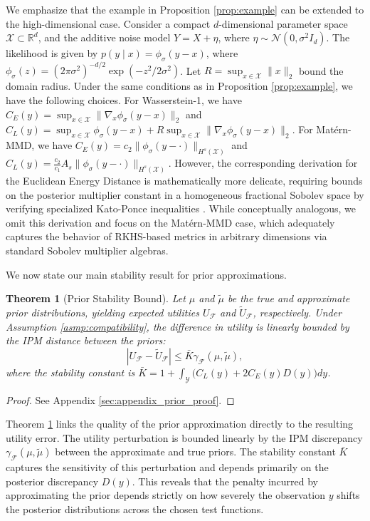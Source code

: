 \documentclass[twoside,11pt]{article}
\newtheorem{thm}{Theorem}[section]
\begin{document}
We emphasize that the example in Proposition \ref{prop:example} can be extended to the high-dimensional case. Consider a compact $d$-dimensional parameter space $\mathcal{X}\subset \mathbb{R}^d$, and the additive noise model $Y=X+\eta$, where $\eta\sim \mathcal{N}(0,\sigma^2 I_d)$. The likelihood is given by $p(y \mid x) = \phi_\sigma(y-x)$, where $\phi_\sigma(z) = (2\pi\sigma^2)^{-d/2} \exp(-z^2 / 2\sigma^2)$. Let $R=\sup_{x\in\mathcal{X}}\|x\|_2$ bound the domain radius. Under the same conditions as in Proposition \ref{prop:example}, we have the following choices. For Wasserstein-1, we have $C_E(y) = \sup_{x\in\mathcal{X}} \|\nabla_x\phi_{\sigma}(y-x)\|_2$ and $C_L(y) = \sup_{x \in \mathcal{X}} \phi_\sigma(y-x) + R \sup_{x \in \mathcal{X}} \|\nabla_x\phi_{\sigma}(y-x)\|_2$. For Mat\'ern-MMD, we have $C_E(y) = c_2 \|\phi_\sigma(y-\cdot)\|_{H^s(\mathcal{X})}$ and $C_L(y) = \frac{c_2}{c_1}A_s\|\phi_\sigma(y-\cdot)\|_{H^s(\mathcal{X})}$. However, the corresponding derivation for the Euclidean Energy Distance is mathematically more delicate, requiring bounds on the posterior multiplier constant in a homogeneous fractional Sobolev space \citep{brasco2021characterisation} by verifying specialized Kato-Ponce inequalities \citep{grafakos2014kato}. While conceptually analogous, we omit this derivation and focus on the Matérn-MMD case, which adequately captures the behavior of RKHS-based metrics in arbitrary dimensions via standard Sobolev multiplier algebras.

We now state our main stability result for prior approximations.

\begin{thm}[Prior Stability Bound] \label{thm:prior}
     Let $\mu$ and $\tilde{\mu}$ be the true and approximate prior distributions, yielding expected utilities $U_{\mathcal{F}}$ and $\tilde{U}_{\mathcal{F}}$, respectively. Under Assumption \ref{asmp:compatibility}, the difference in utility is linearly bounded by the IPM distance between the priors:
    $$|U_{\mathcal{F}} - \tilde{U}_{\mathcal{F}}| \le \bar{K} \gamma_{\mathcal{F}}(\mu, \tilde{\mu}),$$
    where the stability constant is $\bar{K} = 1 + \int_{\mathcal{Y}} \Big( C_L(y) + 2C_E(y)D(y) \Big) dy$.
\end{thm}
\begin{proof}
    See Appendix \ref{sec:appendix_prior_proof}.
\end{proof}

Theorem \ref{thm:prior} links the quality of the prior approximation directly to the resulting utility error. The utility perturbation is bounded linearly by the IPM discrepancy $\gamma_{\mathcal{F}}(\mu, \tilde{\mu})$ between the approximate and true priors. The stability constant $\bar{K}$ captures the sensitivity of this perturbation and depends primarily on the posterior discrepancy $D(y)$. This reveals that the penalty incurred by approximating the prior depends strictly on how severely the observation $y$ shifts the posterior distributions across the chosen test functions.
\end{document}
